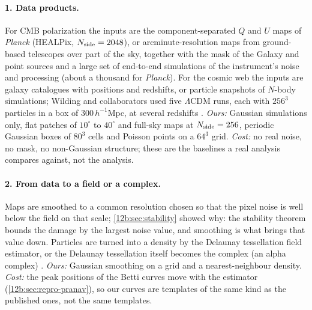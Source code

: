 \paragraph{1. Data products.} For CMB polarization the inputs are the component-separated $Q$ and $U$ maps of
\textit{Planck} (HEALPix, $N_{\rm side}=2048$), or arcminute-resolution maps from ground-based telescopes over part of the
sky, together with the mask of the Galaxy and point sources and a large set of end-to-end simulations of the
instrument's noise and processing (about a thousand for \textit{Planck}). For the cosmic web the inputs are galaxy
catalogues with positions and redshifts, or particle snapshots of $N$-body simulations; Wilding and collaborators used
five $\Lambda$CDM runs, each with $256^3$ particles in a box of $300\,h^{-1}$Mpc, at several redshifts
\cite{Wilding2021}. \emph{Ours:} Gaussian simulations only, flat patches of $10^\circ$ to $40^\circ$ and full-sky maps at
$N_{\rm side}=256$, periodic Gaussian boxes of $80^3$ cells and Poisson points on a $64^3$ grid. \emph{Cost:} no real
noise, no mask, no non-Gaussian structure; these are the baselines a real analysis compares against, not the analysis.

\paragraph{2. From data to a field or a complex.} Maps are smoothed to a common resolution chosen so that the pixel
noise is well below the field on that scale; \cref{12b:sec:stability} showed why: the stability theorem bounds the damage
by the largest noise value, and smoothing is what brings that value down. Particles are turned into a density by the
Delaunay tessellation field estimator, or the Delaunay tessellation itself becomes the complex (an alpha complex)
\cite{Pranav2017}. \emph{Ours:} Gaussian smoothing on a grid and a nearest-neighbour density. \emph{Cost:} the peak
positions of the Betti curves move with the estimator (\cref{12b:sec:repro-pranav}), so our curves are templates of the
same kind as the published ones, not the same templates.

